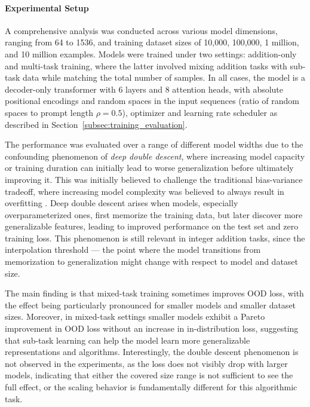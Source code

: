 \paragraph{Experimental Setup}
A comprehensive analysis was conducted across various model dimensions, ranging from 64 to 1536, and training dataset sizes of 10,000, 100,000, 1 million, and 10 million examples. Models were trained under two settings: addition-only and multi-task training, where the latter involved mixing addition tasks with sub-task data while matching the total number of samples. In all cases, the model is a decoder-only transformer with 6 layers and 8 attention heads, with absolute positional encodings and random spaces in the input sequences (ratio of random spaces to prompt length $\rho = 0.5$), optimizer and learning rate scheduler as described in Section~\ref{subsec:training_evaluation}.

The performance was evaluated over a range of different model widths due to the confounding phenomenon of \emph{deep double descent}, where increasing model capacity or training duration can initially lead to worse generalization before ultimately improving it. This was initially believed to challenge the traditional bias-variance tradeoff, where increasing model complexity was believed to always result in overfitting \parencite{belkin_reconciling_2019, nakkiran_deep_2021}. Deep double descent arises when models, especially overparameterized ones, first memorize the training data, but later discover more generalizable features, leading to improved performance on the test set and zero training loss. This phenomenon is still relevant in integer addition tasks, since the interpolation threshold — the point where the model transitions from memorization to generalization might change with respect to model and dataset size.

The main finding is that mixed-task training sometimes improves OOD loss, with the effect being particularly pronounced for smaller models and smaller dataset sizes. Moreover, in mixed-task settings smaller models exhibit a Pareto improvement in OOD loss without an increase in in-distribution loss, suggesting that sub-task learning can help the model learn more generalizable representations and algorithms. Interestingly, the double descent phenomenon is not observed in the experiments, as the loss does not visibly drop with larger models, indicating that either the covered size range is not sufficient to see the full effect, or the scaling behavior is fundamentally different for this algorithmic task.

